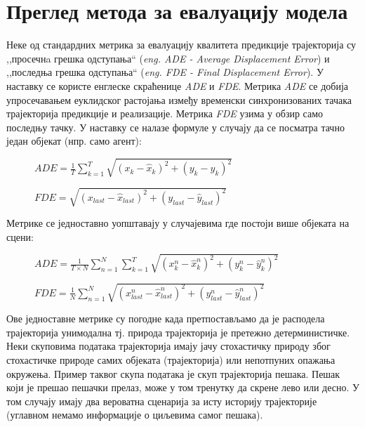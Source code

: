 \documentclass[11pt,oneside]{memoir}
\begin{document}
\chapter{Преглед метода за евалуацију модела}
\label{chp:razrada}

Неке од стандардних метрика за евалуацију квалитета предикције трајекторија су ,,просечнa грешка одступања`` (\textit{eng. ADE - Average Displacement Error})
и ,,последња грешка одступања`` (\textit{eng. FDE - Final Displacement Error}). У наставку се користе енглеске скраћенице \textit{ADE} и
\textit{FDE}. Метрика \textit{ADE} се добија
упросечавањем еуклидског растојања између временски синхронизованих тачака трајекторија предикције и реализације. 
Метрика \textit{FDE} узима у обзир само последњу тачку. \cite{social_gan} \cite{argoverse} 
У наставку се налазе формуле у случају да се посматра тачно један објекат (нпр. само агент):

\begin{figure}[h!]
  \centering
  $ADE = \frac{1}{T}\sum_{k=1}^{T}\sqrt{(x_k - \hat{x}_k)^2 + (y_k - \hat{y}_k)^2}$
\end{figure}

\begin{figure}[h!]
  \centering
  $FDE = \sqrt{(x_{last} - \hat{x}_{last})^2 + (y_{last} - \hat{y}_{last})^2}$
\end{figure}

Метрике се једноставно уопштавају у случајевима где постоји више објеката на сцени:

\begin{figure}[h!]
  \centering
  $ADE = \frac{1}{T\times N}\sum_{n=1}^{N}\sum_{k=1}^{T}\sqrt{(x^n_k - \hat{x}^n_k)^2 + (y^n_k - \hat{y}^n_k)^2}$
\end{figure}

\begin{figure}[h!]
  \centering
  $FDE = \frac{1}{N}\sum_{n=1}^{N}\sqrt{(x^n_{last} - \hat{x}^n_{last})^2 + (y^n_{last} - \hat{y}^n_{last})^2}$
\end{figure}

Ове једноставне метрике су погодне када претпостављамо да је расподела трајекторија унимодална тј. природа трајекторија је претежно детерминистичке. 
Неки скуповима података трајекторија имају јачу стохастичку природу због стохастичке природе самих објеката (трајекторија) или непотпуних опажања окружења. 
Пример таквог скупа података је скуп трајекторија пешака. Пешак који је прешао пешачки прелаз, може у том тренутку да скрене лево или десно.
У том случају имају два вероватна сценарија за исту историју трајекторије (углавном немамо информације о циљевима самог пешака). \cite{social_gan} \cite{best_of_many_cvae}
\end{document}
